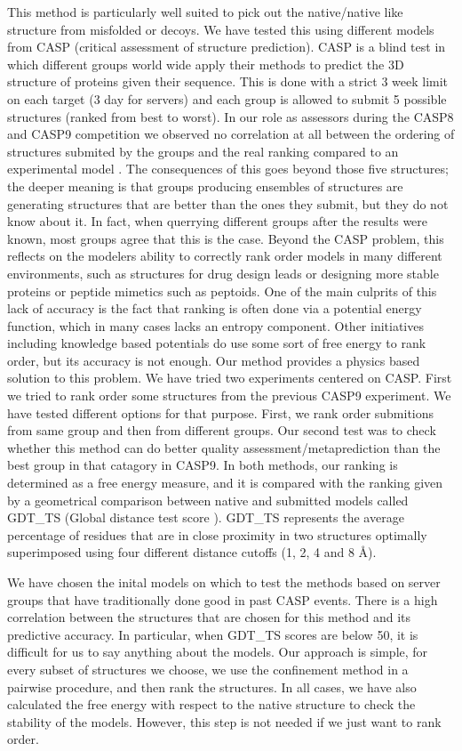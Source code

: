 \documentclass[12pt]{article}
\begin{document}
This method is particularly well suited to pick out the native/native like structure from misfolded or decoys. We have
tested this using different models from CASP (critical assessment of structure
prediction). CASP is a blind test in which different groups world wide apply their
methods to predict the 3D structure of proteins given their sequence. This is done with a strict 3
week limit on each target (3 day for servers) and each group is allowed to submit 5 possible
structures (ranked from best to worst). In our role as assessors during the CASP8 and CASP9 \cite{MacCallum2011}
competition we observed no correlation at all between the ordering of structures submited by the
groups and the real ranking compared to an experimental model \cite{Kryshtafovych2011}. The
consequences of this goes beyond
those five structures; the deeper meaning is that groups producing ensembles of structures are
generating structures that are better than the ones they submit, but they do not know about it. In
fact, when querrying different groups after the results were known, most groups agree that this is
the case. Beyond the CASP problem, this reflects on the modelers ability to correctly rank order
models in many different environments, such as structures for drug design leads or designing more
stable proteins or peptide mimetics such as peptoids. One of the main culprits of this lack of
accuracy is the fact that ranking is often done via a potential energy function, which in many cases
lacks an entropy component. Other initiatives including knowledge based potentials do use some sort
of free energy to rank order, but its accuracy is not enough. Our method provides a physics based
solution to this problem. We have tried two experiments centered on CASP. First we tried to rank
order some structures from the previous CASP9 experiment. We have tested different options for that purpose.
First, we rank order submitions from same group and then from different groups. Our second test was 
to check whether this method can do better quality assessment/metaprediction than the best group in that catagory in CASP9. 
In both methods, our ranking is determined as a free energy measure,
and it is compared with the ranking given by a geometrical comparison between native and submitted
models called GDT\_TS (Global distance test score \cite{Zemla2003}). 
GDT\_TS represents the average percentage of residues that are in close proximity in two
structures optimally superimposed using four different distance cutoffs (1, 2, 4 and 8 \AA).

We have chosen the inital models on which to test the methods based on server groups that have
traditionally done good in past CASP events. There is a high correlation between the structures that
are chosen for this method and its predictive accuracy. In particular, when GDT\_TS scores are below
50, it is difficult for us to say anything about the models. Our approach is simple, for every
subset of structures we choose, we use the confinement method in a pairwise procedure, and then rank
the structures. In all cases, we have also calculated the free energy with respect to the native
structure to check the stability of the models.
However, this step is not needed if we just want to rank order.
\end{document}

